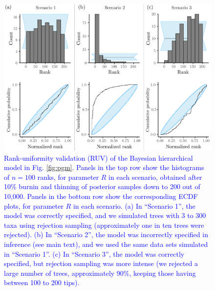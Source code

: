 \documentclass[oneside]{article}
\begin{document}
\begin{figure}
  \centering
  \includegraphics[width=0.9\linewidth]{../figures/sbc_Yule_BM_r_manual.pdf}
  \caption{
    \textcolor{blue}{Rank-uniformity validation (RUV) of the Bayesian hierarchical model in Fig. \ref{fig:pgm}.
    Panels in the top row show the histograms of $n=100$ ranks, for parameter $R$ in each scenario, obtained after 10\% burnin and thinning of posterior samples down to 200 out of 10,000.
    Panels in the bottom row show the corresponding ECDF plots, for parameter $R$ in each scenario.
    (a) In ``Scenario 1'', the model was correctly specified, and we simulated trees with 3 to 300 taxa using rejection sampling (approximately one in ten trees were rejected).
    (b) In ``Scenario 2'', the model was incorrectly specified in inference (see main text), and we used the same data sets simulated in ``Scenario 1''.
    (c) In ``Scenario 3'', the model was correctly specified, but rejection sampling was more intense (we rejected a large number of trees, approximately 90\%, keeping those having between 100 to 200 tips).}
  }
  \label{fig:ruv_yule}
\end{figure}
\end{document}

